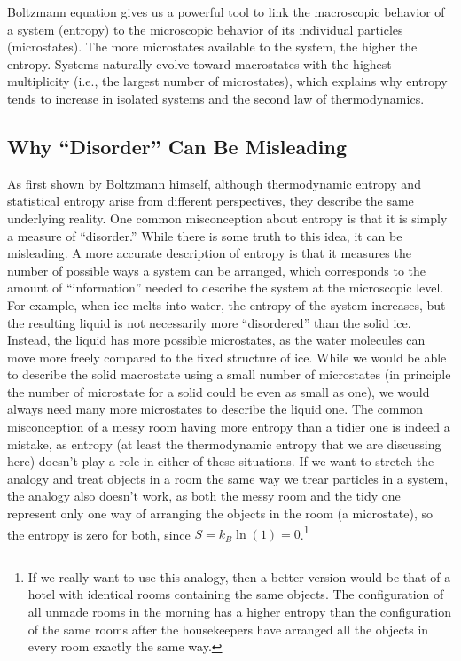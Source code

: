 \documentclass[
  9pt,
]{extbook}
\theoremstyle{definition}
\theoremstyle{definition}
\theoremstyle{definition}
\theoremstyle{definition}
\theoremstyle{remark}
\begin{document}
Boltzmann equation gives us a powerful tool to link the macroscopic behavior of a system (entropy) to the microscopic behavior of its individual particles (microstates). The more microstates available to the system, the higher the entropy. Systems naturally evolve toward macrostates with the highest multiplicity (i.e., the largest number of microstates), which explains why entropy tends to increase in isolated systems and the second law of thermodynamics.

\subsection{Why ``Disorder'' Can Be Misleading}\label{why-disorder-can-be-misleading}

As first shown by Boltzmann himself, although thermodynamic entropy and statistical entropy arise from different perspectives, they describe the same underlying reality. One common misconception about entropy is that it is simply a measure of ``disorder.'' While there is some truth to this idea, it can be misleading. A more accurate description of entropy is that it measures the number of possible ways a system can be arranged, which corresponds to the amount of ``information'' needed to describe the system at the microscopic level. For example, when ice melts into water, the entropy of the system increases, but the resulting liquid is not necessarily more ``disordered'' than the solid ice. Instead, the liquid has more possible microstates, as the water molecules can move more freely compared to the fixed structure of ice. While we would be able to describe the solid macrostate using a small number of microstates (in principle the number of microstate for a solid could be even as small as one), we would always need many more microstates to describe the liquid one. The common misconception of a messy room having more entropy than a tidier one is indeed a mistake, as entropy (at least the thermodynamic entropy that we are discussing here) doesn't play a role in either of these situations. If we want to stretch the analogy and treat objects in a room the same way we trear particles in a system, the analogy also doesn't work, as both the messy room and the tidy one represent only one way of arranging the objects in the room (a microstate), so the entropy is zero for both, since \(S=k_B \ln(1)=0\).\footnote{If we really want to use this analogy, then a better version would be that of a hotel with identical rooms containing the same objects. The configuration of all unmade rooms in the morning has a higher entropy than the configuration of the same rooms after the housekeepers have arranged all the objects in every room exactly the same way.}
\end{document}
